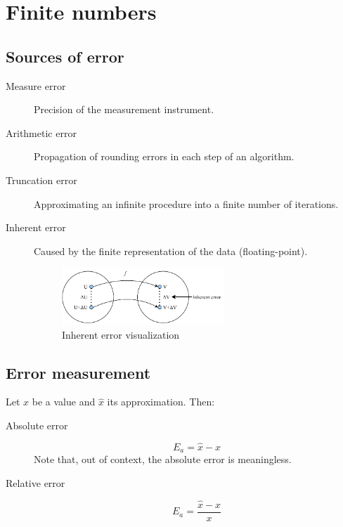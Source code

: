 \section{Finite numbers}



\subsection{Sources of error}

\begin{description}
    \item[Measure error] 
        Precision of the measurement instrument.

    \item[Arithmetic error] 
        Propagation of rounding errors in each step of an algorithm.

    \item[Truncation error] 
        Approximating an infinite procedure into a finite number of iterations.

    \item[Inherent error] 
        Caused by the finite representation of the data (floating-point).
        \begin{figure}[h]
            \centering
            \includegraphics[width=0.6\textwidth]{img/_inherent_error.pdf}
            \caption{Inherent error visualization}
        \end{figure}
\end{description}



\subsection{Error measurement}

Let $x$ be a value and $\hat{x}$ its approximation. Then:
\begin{description}
    \item[Absolute error] 
        \begin{equation}
            E_{a} = \hat{x} - x
        \end{equation}
        Note that, out of context, the absolute error is meaningless.
    \item[Relative error] 
        \begin{equation}
            E_{a} = \frac{\hat{x} - x}{x}
        \end{equation}
\end{description}



